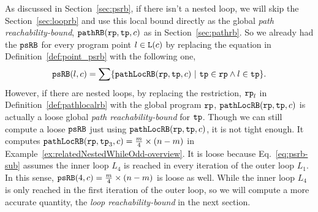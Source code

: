  As discussed in Section~\ref{sec:psrb}, if there isn't a nested loop, we will skip the Section~\ref{sec:looprb} and use this local bound directly as the global \emph{path reachability-bound}, $\mathtt{pathRB}(\mathtt{rp}, \mathtt{tp}, c)$ as in Section~\ref{sec:pathrb}. 
 So we already had the $\mathtt{psRB}$ for every program point $l \in \mathtt{L}(c)$ by replacing the equation in Definition~\ref{def:point_psrb} with the following one,
 \begin{equation}
 \label{eq:psrb-sub}
 \psRB(l, c) = 
 \sum
 \left\{ \outinB(\rprog, \tpath, c) ~\vert~ \tpath \in \rprog \land 
 l \in \tpath \right\}.
 \end{equation}
 However, if there are nested loops, 
 by replacing the restriction, $\mathtt{rp}_l$ in Definition~\ref{def:pathlocalrb} with the global program $\mathtt{rp}$, $\mathtt{pathLocRB}(\mathtt{rp}, \mathtt{tp}, c)$ is actually a loose global \emph{path reachability-bound} for $\mathtt{tp}$. Though we can still compute a loose $\mathtt{psRB}$ just using $\mathtt{pathLocRB}(\mathtt{rp}, \mathtt{tp}, c)$, it is not tight enough. 
It computes
$\mathtt{pathLocRB}(\mathtt{rp}, \mathtt{tp}_3, c) = \frac{m}{4} \times (n - m)$ in Example~\ref{ex:relatedNestedWhileOdd-overview}.
It is loose because Eq.~\ref{eq:psrb-sub} assumes the inner loop $L_4$ is reached in every iteration of the outer loop $L_1$. In this sense, $\mathtt{psRB}(4, c) = \frac{m}{4} \times (n - m)$ is loose as well.
While the inner loop $L_4$ is only reached in the first iteration of the outer loop,
so we will compute a more accurate quantity, the \emph{loop reachability-bound} in the next section.

